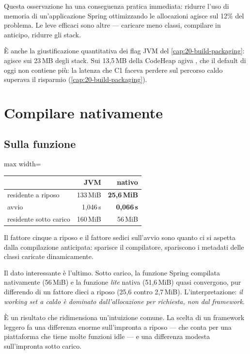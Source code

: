 Questa osservazione ha una conseguenza pratica immediata: ridurre l'uso di
memoria di un'applicazione Spring ottimizzando le allocazioni agisce sul 12\% del
problema. Le leve efficaci sono altre --- caricare meno classi, compilare in
anticipo, ridurre gli stack.

\`E anche la giustificazione quantitativa dei flag JVM del
\cref{cap:20-build-packaging}:  agisce sui 23\,MB degli stack. Sui 13{,}5\,MB della CodeHeap
agiva , che il default di oggi non contiene pi\`u:
la latenza che C1 faceva perdere sul percorso caldo superava il risparmio
(\cref{cap:20-build-packaging}).

\section{Compilare nativamente}

\subsection{Sulla funzione}

\begin{center}
\small
\begin{adjustbox}{max width=\textwidth}
\begin{tabular}{@{}lrr@{}}
\toprule
 & \textbf{JVM} & \textbf{nativo} \\
\midrule
residente a riposo & 133\,MiB & \textbf{25{,}6\,MiB} \\
avvio & 1{,}046\,s & \textbf{0{,}066\,s} \\
residente sotto carico & 160\,MiB & 56\,MiB \\
\bottomrule
\end{tabular}
\end{adjustbox}
\end{center}

Il fattore cinque a riposo e il fattore sedici sull'avvio sono quanto ci si
aspetta dalla compilazione anticipata: sparisce il compilatore, spariscono i
metadati delle classi caricate dinamicamente.

Il dato interessante \`e l'ultimo. Sotto carico, la funzione Spring compilata
nativamente (56\,MiB) e la funzione \emph{lite} nativa (51{,}6\,MiB) quasi
convergono, pur differendo di un fattore dieci a riposo (25{,}6 contro
2{,}7\,MiB). L'interpretazione: \emph{il working set a caldo \`e dominato
dall'allocazione per richiesta, non dal framework}.

\`E un risultato che ridimensiona un'intuizione comune. La scelta di un framework
leggero fa una differenza enorme sull'impronta a riposo --- che conta per una
piattaforma che tiene molte funzioni idle --- e una differenza modesta
sull'impronta sotto carico.

